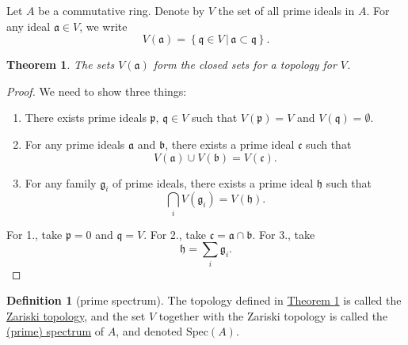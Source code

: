 \documentclass[a4paper,10pt]{scrreprt}
\newcommand{\defn}[1]{\ul{#1}}
\newcommand{\Spec}{\mathrm{Spec}}
\theoremstyle{definition}
\newtheorem{definition}{Definition}[section]
\theoremstyle{plain}
\newtheorem{theorem}{Theorem}[section]
\theoremstyle{remark}
\begin{document}
Let $A$ be a commutative ring. Denote by $V$ the set of all prime ideals in $A$. For any ideal $\mathfrak{a} \in V$, we write
\begin{equation*}
  V(\mathfrak{a}) = \left\{ \mathfrak{q} \in V\,\big|\, \mathfrak{a} \subset \mathfrak{q} \right\}.
\end{equation*}

\begin{theorem}
  \label{thm:zartopisatopology}
  The sets $V(\mathfrak{a})$ form the closed sets for a topology for $V$.
\end{theorem}
\begin{proof}
  We need to show three things:
  \begin{enumerate}
    \item There exists prime ideals $\mathfrak{p}$, $\mathfrak{q} \in V$ such that $V(\mathfrak{p}) = V$ and $V(\mathfrak{q}) = \emptyset$.

    \item For any prime ideals $\mathfrak{a}$ and $\mathfrak{b}$, there exists a prime ideal $\mathfrak{c}$ such that 
      \begin{equation*}
        V(\mathfrak{a}) \cup V(\mathfrak{b}) = V(\mathfrak{c}).
      \end{equation*}

    \item For any family $\mathfrak{g}_{i}$ of prime ideals, there exists a prime ideal $\mathfrak{h}$ such that 
      \begin{equation*}
        \bigcap_{i} V(\mathfrak{g}_{i}) = V(\mathfrak{h}).
      \end{equation*}
  \end{enumerate}

  For 1., take $\mathfrak{p} = 0$ and $\mathfrak{q} = V$. For 2., take $\mathfrak{c} = \mathfrak{a} \cap \mathfrak{b}$. For 3., take 
  \begin{equation*}
    \mathfrak{h} = \sum_{i} \mathfrak{g}_{i}.
  \end{equation*}
\end{proof}

\begin{definition}[prime spectrum]
  \label{def:primespectrumofaring}
  The topology defined in \hyperref[thm:zartopisatopology]{Theorem \ref*{thm:zartopisatopology}} is called the \defn{Zariski topology}, and the set $V$ together with the Zariski topology is called the \defn{(prime) spectrum} of $A$, and denoted $\Spec(A)$.
\end{definition}
\end{document}
